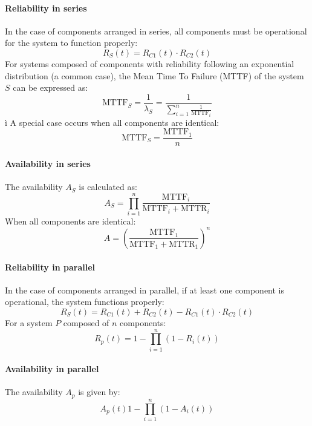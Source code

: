 \paragraph*{Reliability in series}
In the case of components arranged in series, all components must be operational for the system to function properly:
\[R_S(t)=R_{C1}(t)\cdot R_{C2}(t)\]
For systems composed of components with reliability following an exponential distribution (a common case), the Mean Time To Failure (MTTF) of the system $S$ can be expressed as:
\[\text{MTTF}_S=\dfrac{1}{\lambda_S}=\dfrac{1}{\sum_{i=1}^{n}\frac{1}{\text{MTTF}_i}}\]ì
A special case occurs when all components are identical:
\[\text{MTTF}_S=\dfrac{\text{MTTF}_1}{n}\]
\paragraph*{Availability in series}
The availability $A_S$ is calculated as:
\[A_S=\prod_{i=1}^{n}\dfrac{\text{MTTF}_i}{\text{MTTF}_i+\text{MTTR}_i}\]
When all components are identical:
\[A={\left( \dfrac{\text{MTTF}_1}{\text{MTTF}_1+\text{MTTR}_1} \right)}^n\]
\paragraph*{Reliability in parallel}
In the case of components arranged in parallel, if at least one component is operational, the system functions properly:
\[R_S(t)=R_{C1}(t)+R_{C2}(t)-R_{C1}(t)\cdot R_{C2}(t)\]
For a system $P$ composed of $n$ components: 
\[R_p(t)=1-\prod_{i=1}^{n}\left( 1-R_i(t) \right)\]
\paragraph*{Availability in parallel}
The availability $A_p$ is given by:
\[A_p(t)1-\prod_{i=1}^{n}\left(1-A_i(t)\right)\]

